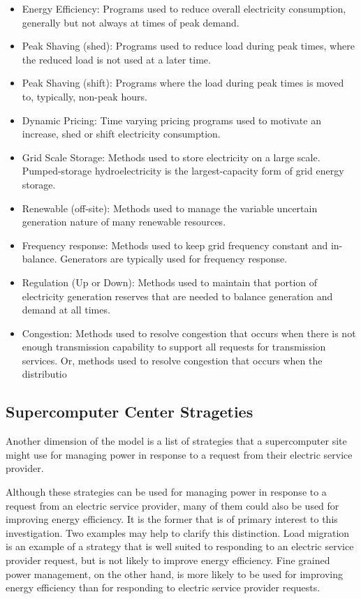 \begin{itemize}
\item Energy Efficiency: Programs used to reduce overall electricity consumption, generally but not always at times of
 peak demand.
\item Peak Shaving (shed): Programs used to reduce load during peak times, where the reduced load is not used at a 
later time.
\item Peak Shaving (shift): Programs where the load during peak times is moved to, typically, non-peak hours.
\item Dynamic Pricing: Time varying pricing programs used to motivate an increase, shed or shift electricity consumption.
\item Grid Scale Storage: Methods used to store electricity on a large scale. Pumped-storage hydroelectricity 
is the largest-capacity form of grid energy storage.
\item Renewable (off-site): Methods used to manage the variable uncertain generation nature of many renewable resources.
\item Frequency response: Methods used to keep grid frequency constant and in-balance. Generators are typically used for frequency response.
\item Regulation (Up or Down): Methods used to maintain that portion of electricity generation reserves 
that are needed to balance generation and demand at all times.
\item Congestion: Methods used to resolve congestion that occurs when there is not enough transmission capability to 
support all requests for transmission services. Or, methods used to resolve congestion that occurs when the distributio
\end{itemize}


\subsection{Supercomputer Center Strageties}

Another dimension of the model is a list of strategies that a supercomputer
site might use for managing power in response to a request from their
electric service provider.

Although these strategies can be used for managing power in response to a
request from an electric service provider, many of them could also be used
for improving energy efficiency. It is the former that is of primary
interest to this investigation. Two examples may help to clarify this
distinction. Load migration is an example of a strategy that is well suited
to responding to an electric service provider request, but is not likely to
improve energy efficiency. Fine grained power management, on the other hand,
is more likely to be used for improving energy efficiency than for
responding to electric service provider requests.


